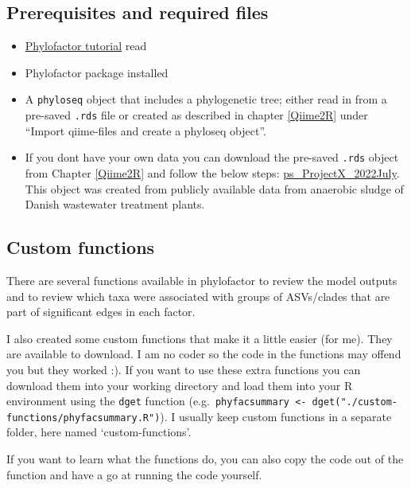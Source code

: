 \documentclass[
]{book}
\providecommand{\tightlist}{%
  \setlength{\itemsep}{0pt}\setlength{\parskip}{0pt}}
\begin{document}
\hypertarget{prerequisites-and-required-files-1}{%
\subsection{Prerequisites and required files}\label{prerequisites-and-required-files-1}}

\begin{itemize}
\tightlist
\item
  \href{https://docs.wixstatic.com/ugd/0119a1_099ae20df8424af9a38585dcebc0d45a.pdf}{Phylofactor tutorial} read\\
\item
  Phylofactor package installed\\
\item
  A \texttt{phyloseq} object that includes a phylogenetic tree; either read in from a pre-saved \texttt{.rds} file or created as described in chapter \ref{Qiime2R} under ``Import qiime-files and create a phyloseq object''.\\
\item
  If you dont have your own data you can download the pre-saved \texttt{.rds} object from Chapter \ref{Qiime2R} and follow the below steps: \href{./ps_ProjectX_2022July}{ps\_ProjectX\_2022July}. This object was created from publicly available data from anaerobic sludge of Danish wastewater treatment plants.
\end{itemize}

\hypertarget{custom-functions}{%
\subsection{Custom functions}\label{custom-functions}}

There are several functions available in phylofactor to review the model outputs and to review which taxa were associated with groups of ASVs/clades that are part of significant edges in each factor.

I also created some custom functions that make it a little easier (for me). They are available to download. I am no coder so the code in the functions may offend you but they worked :). If you want to use these extra functions you can download them into your working directory and load them into your R environment using the \texttt{dget} function (e.g.~\texttt{phyfacsummary\ \textless{}-\ dget("./custom-functions/phyfacsummary.R")}). I usually keep custom functions in a separate folder, here named `custom-functions'.

If you want to learn what the functions do, you can also copy the code out of the function and have a go at running the code yourself.
\end{document}
